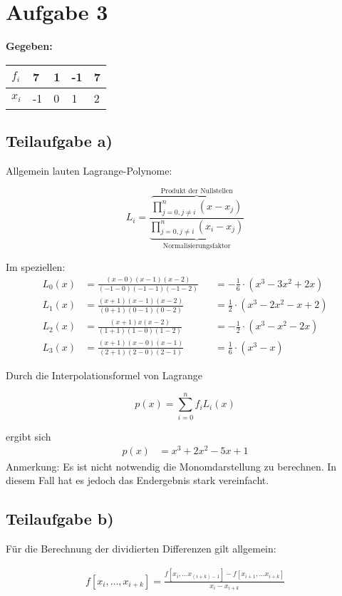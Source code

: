 \section*{Aufgabe 3}
\textbf{Gegeben:}

\begin{table}[h!]
    \begin{tabular}{l||l|l|l|l}
    $f_i$ & 7  & 1 & -1 & 7 \\\hline
    $x_i$ & -1 & 0 & 1  & 2 \\
    \end{tabular}
\end{table}

\subsection*{Teilaufgabe a)}
Allgemein lauten Lagrange-Polynome:

\[L_i = \frac{\overbrace{\prod_{j=0, j \neq i}^n (x-x_j)}^\text{Produkt der Nullstellen}}{\underbrace{\prod_{j=0, j \neq i}^n (x_i - x_j)}_\text{Normalisierungsfaktor}}\]

Im speziellen:
\begin{align}
	L_0(x) &= \frac{(x-0)(x-1)(x-2)}{(-1-0)(-1-1)(-1-2)} &&=-\frac{1}{6} \cdot (x^3 - 3 x^2 + 2x)\\
	L_1(x) &= \frac{(x+1)(x-1)(x-2)}{(0+1)(0-1)(0-2)}    &&= \frac{1}{2} \cdot (x^3 - 2x^2 - x + 2)\\
	L_2(x) &= \frac{(x+1)x(x-2)}{(1+1)(1-0)(1-2)}        &&=-\frac{1}{2} \cdot (x^3 - x^2 - 2x)\\
	L_3(x) &= \frac{(x+1)(x-0)(x-1)}{(2+1)(2-0)(2-1)}    &&= \frac{1}{6} \cdot (x^3 - x)
\end{align}

Durch die Interpolationsformel von Lagrange

\[p(x) = \sum_{i=0}^n f_i L_i(x)\]

ergibt sich
\begin{align}
	p(x) &= x^3 + 2x^2 - 5x + 1
\end{align}
Anmerkung: Es ist nicht notwendig die Monomdarstellung zu berechnen.
In diesem Fall hat es jedoch das Endergebnis stark vereinfacht.

\subsection*{Teilaufgabe b)}
Für die Berechnung der dividierten Differenzen gilt allgemein:

\begin{align}
    f[x_i, \dots, x_{i+k}] = \frac{f[x_i, \dots x_{(i+k)-1}] - f[x_{i+1}, \dots x_{i+k}]}{x_i - x_{i+k}}
\end{align}

